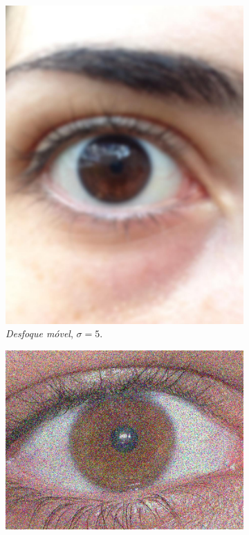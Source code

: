 \begin{figure}[H]
    \centering %
\begin{subfigure}{0.25\textwidth}
  \includegraphics[width=\linewidth]{img/Resultados/ruidos/gaussian5.jpg}
  \caption{\textit{Desfoque móvel}, $\sigma=5$.}
\end{subfigure}\hfil %
\begin{subfigure}{0.25\textwidth}
  \includegraphics[width=\linewidth]{img/Resultados/ruidos/impulse0,35.jpg}

\end{subfigure}
\end{figure}
